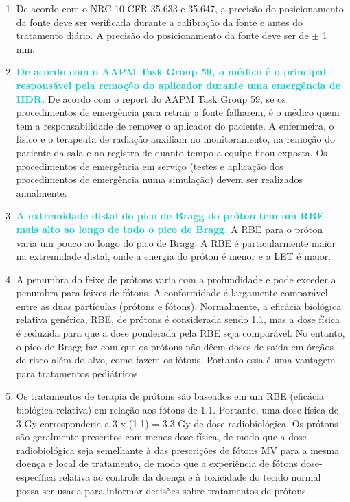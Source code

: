 \documentclass[11pt,a4paper]{article}
\begin{document}
\begin{enumerate}
        \item De acordo com o NRC 10 CFR 35.633 e 35.647, a precisão do posicionamento da fonte deve ser verificada durante a calibração da fonte e antes do tratamento diário. A precisão do posicionamento da fonte deve ser de $\pm$ 1 mm.
    
        \item \textcolor{DarkTurquoise}{\textbf{De acordo com o AAPM Task Group 59, o médico é o principal responsável pela remoção do aplicador durante uma emergência de HDR.}} De acordo com o report do AAPM Task Group 59, se os procedimentos de emergência para retrair a fonte falharem, é o médico quem tem a responsabilidade de remover o aplicador do paciente. A enfermeira, o físico e o terapeuta de radiação auxiliam no monitoramento, na remoção do paciente da sala e no registro de quanto tempo a equipe ficou exposta. Os procedimentos de emergência em serviço (testes e aplicação dos procedimentos de emergência numa simulação) devem ser realizados anualmente.
    
        \item \textcolor{DarkTurquoise}{\textbf{A extremidade distal do pico de Bragg do próton tem um RBE mais alto ao longo de todo o pico de Bragg.}} A RBE para o  próton varia um pouco ao longo do pico de Bragg. A RBE é particularmente maior na extremidade distal, onde a energia do próton é menor e a LET é maior.
    
        \item A penumbra do feixe de prótons varia com a profundidade e pode exceder a penumbra para feixes de fótons. A conformidade é largamente comparável entre as duas partículas (prótons e fótons). Normalmente, a eficácia biológica relativa genérica, RBE, de prótons é considerada sendo 1.1, mas a dose física é reduzida para que a dose ponderada pela RBE seja comparável. No entanto, o pico de Bragg faz com que os prótons não dêem doses de saída em órgãos de risco além do alvo, como fazem os fótons. Portanto essa é uma vantagem para tratamentos pediátricos.
    
        \item Os tratamentos de terapia de prótons são baseados em um RBE (eficácia biológica relativa) em relação aos fótons de 1.1. Portanto, uma dose física de 3 Gy corresponderia a 3 x (1.1) = 3.3 Gy de dose radiobiológica. Os prótons são geralmente prescritos com menos dose física, de modo que a dose radiobiológica seja semelhante à das prescrições de fótons MV para a mesma doença e local de tratamento, de modo que a experiência de fótons dose-específica relativa ao controle da doença e à toxicidade do tecido normal possa ser usada para informar decisões sobre tratamentos de prótons.
    

\end{enumerate}
\end{document}
